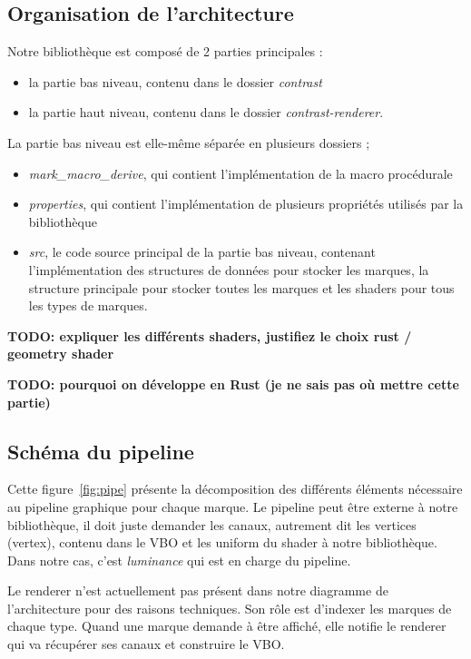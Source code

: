 \documentclass[12pt]{article}
\begin{document}
\subsection{Organisation de l'architecture}

Notre bibliothèque est composé de 2 parties principales :
\begin{itemize}
\item la partie bas niveau, contenu dans le dossier \textit{contrast}
\item la partie haut niveau, contenu dans le dossier  \textit{contrast-renderer}.
\end{itemize}

La partie bas niveau est elle-même séparée en plusieurs dossiers ;
\begin{itemize}
\item \textit{mark\_macro\_derive}, qui contient l'implémentation de la macro procédurale
\item \textit{properties}, qui contient l'implémentation de plusieurs propriétés utilisés par la bibliothèque 
\item \textit{src}, le code source principal de la partie bas niveau, contenant l'implémentation des structures de données pour stocker les marques, la structure principale pour stocker toutes les marques et les shaders pour tous les types de marques.
\end{itemize}

\textbf{TODO: expliquer les différents shaders, justifiez le choix rust / geometry shader}

\textbf{TODO: pourquoi on développe en Rust (je ne sais pas où mettre cette partie)}

\subsection{Schéma du pipeline}

Cette figure~\ref{fig:pipe} présente la décomposition des différents éléments nécessaire au \gls{pipeline}
graphique pour chaque marque. Le pipeline peut être externe à notre bibliothèque, il doit juste demander
les canaux, autrement dit les vertices (\gls{vertex}), contenu dans le \gls{VBO} et les \gls{uniform}
du \gls{shader} à notre bibliothèque\cite{Semi}.
Dans notre cas, c'est \textit{luminance} \cite{luminance} qui est en charge du pipeline.

Le renderer n'est actuellement pas présent dans notre diagramme de l'architecture pour des 
raisons techniques. Son rôle est d'indexer les marques de chaque type. Quand une marque demande
à être affiché, elle notifie le renderer qui va récupérer ses canaux et construire le VBO.
\end{document}
